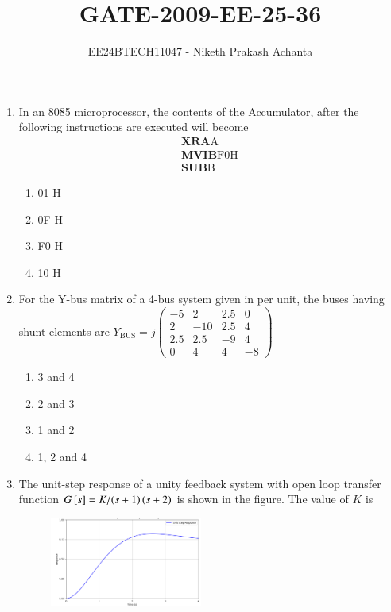 \documentclass[journal]{IEEEtran}
\renewcommand{\thefigure}{\theenumi}
\renewcommand{\thetable}{\theenumi}
\numberwithin{equation}{enumi}
\numberwithin{figure}{enumi}
\renewcommand{\thetable}{\theenumi}
\begin{document}

\vspace{3cm}

\title{GATE-2009-EE-25-36}
\author{EE24BTECH11047 - Niketh Prakash Achanta}
{\let\newpage\relax\maketitle}
\renewcommand{\thefigure}{\theenumi}
\renewcommand{\thetable}{\theenumi}
\begin{enumerate}[start=25]
\item In an 8085 microprocessor, the contents of the Accumulator, after the following instructions are executed will become
\begin{align*}
\mathbf{XRA} \text{A} \\
\mathbf{MVIB} \text{F0H}\\
\mathbf{SUB} \text{B}
\end{align*}
\begin{enumerate}
\item 01 H
\item 0F H
\item F0 H
\item 10 H
\end{enumerate}
\item For the Y-bus matrix of a 4-bus system given in per unit, the buses having shunt elements are
$
Y_{\text{BUS}} = j
\begin{pmatrix}
-5 & 2 & 2.5 & 0 \\
2 & -10 & 2.5 & 4 \\
2.5 & 2.5 & -9 & 4 \\
0 & 4 & 4 & -8
\end{pmatrix}
$
\begin{enumerate}
\item 3 and 4
\item 2 and 3
\item 1 and 2
\item 1, 2 and 4
\end{enumerate}
\item The unit-step response of a unity feedback system with open loop transfer function $G{}\left[s\right]=K/{\left(s+1\right)\left(s+2\right)}$ is shown in the figure. The value of $K$ is
\begin{figure}[!ht]
    \centering
    \includegraphics[width=5cm]{figs/fig1.png}

\end{figure}
\end{enumerate}
\end{document}
